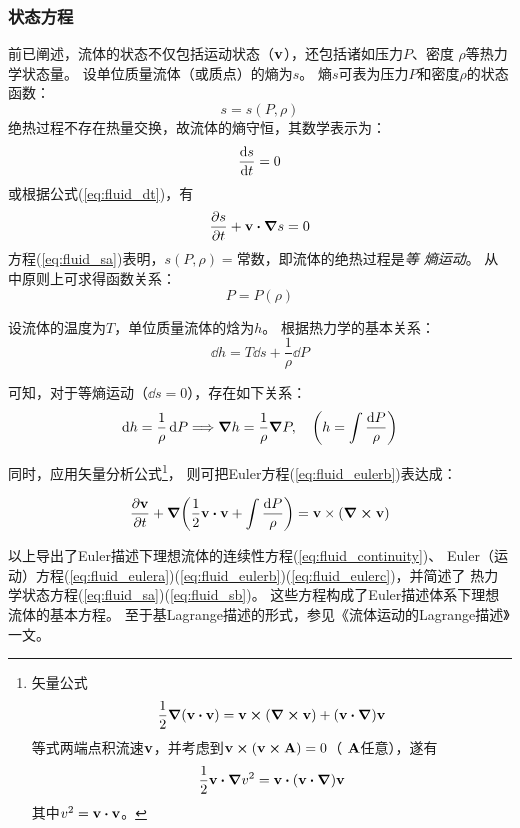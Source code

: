 \documentclass[UTF8]{ctexbook}
\begin{document}
\subsubsection{状态方程}
前已阐述，流体的状态不仅包括运动状态（$\vb{v}$），还包括诸如压力$P$、密度
$\rho$等热力学状态量。
设单位质量流体（或质点）的熵为$s$。
熵$s$可表为压力$P$和密度$\rho$的状态函数：
$$s = s(P,\rho)$$
绝热过程不存在热量交换，故流体的熵守恒，其数学表示为：
\begin{equation}
	\dv{s}{t} = 0
	\label{eq:fluid_sa}
\end{equation}
或根据公式(\ref{eq:fluid_dt})，有
\begin{equation}
	\pdv{s}{t} +\vb{v}\vdot \grad s = 0
	\label{eq:fluid_sb}
\end{equation}
方程(\ref{eq:fluid_sa})表明，$s(P,\rho)=$常数，即流体的绝热过程是\emph{等
	熵运动}。
从中原则上可求得函数关系：
\begin{equation}
	P=P(\rho)
\end{equation}

设流体的温度为$T$，单位质量流体的焓为$h$。
根据热力学的基本关系：
\begin{equation}
	\dd h = T\dd s + \frac1\rho \dd{P}
\end{equation}

可知，对于等熵运动（$\dd s=0$），存在如下关系：
\begin{equation}
		\dd h = \frac1\rho \dd{P}
		\imp \grad h  = \frac1\rho \grad P\qc \qty(h=\int \frac{\dd P}{\rho}
		)
\end{equation}

同时，应用矢量分析公式\footnote{
矢量公式
$$\frac12 \grad (\vb{v}\vdot \vb{v}) = \vb{v}\cp \qty(\curl \vb{v}) + 
\qty(\vb{v}\vdot \grad)\vb{v}$$
等式两端点积流速$\vb{v}$，并考虑到$\vb{v}\cp (\vb{v}\cp \vb{A}) = 0$（
$\vb{A}$任意），遂有
$$\frac12 \vb{v} \vdot \grad v^2 =   \vb{v}\vdot \qty(\vb{v}\vdot
\grad)\vb{v}$$
其中$v^2=\vb{v}\vdot \vb{v}$。}，
则可把Euler方程(\ref{eq:fluid_eulerb})表达成：

\begin{equation}
	\pdv{\vb{v}}{t} +\grad \qty(\frac12 \vb{v}\vdot \vb{v} + \int\frac{
	\dd P}{\rho} ) = \vb{v}\times\qty(\curl \vb{v})
\end{equation}

以上导出了Euler描述下理想流体的连续性方程(\ref{eq:fluid_continuity})、
Euler（运动）方程(\ref{eq:fluid_eulera})(\ref{eq:fluid_eulerb})(\ref{eq:fluid_eulerc})，并简述了
热力学状态方程(\ref{eq:fluid_sa})(\ref{eq:fluid_sb})。
这些方程构成了Euler描述体系下理想流体的基本方程。
至于基Lagrange描述的形式，参见《流体运动的Lagrange描述》一文。
\end{document}
